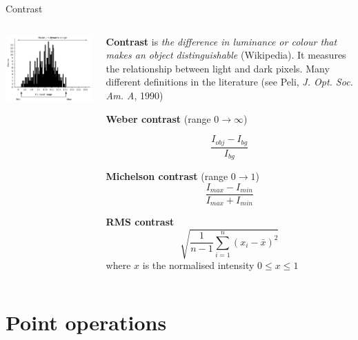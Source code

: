 \documentclass[9pt, aspectratio=169]{beamer}
\begin{document}
\begin{frame}
    {Contrast}
    \begin{columns}
        \begin{column}{.4\textwidth}
            \includegraphics[width=\textwidth]{contrast range.png}
        \end{column}
        \begin{column}{.6\textwidth}
            \textbf{Contrast} is \textit{the difference in luminance or colour that makes an object distinguishable} (Wikipedia). It measures the relationship between light and dark pixels.
            \pause
            Many different definitions in the literature (see Peli, \textit{J. Opt. Soc. Am. A}, 1990)

            \textbf{Weber contrast} (range $0 \rightarrow \infty$)

            $$\frac{I_{obj}-I_{bg}}{I_{bg}}$$

            \textbf{Michelson contrast} (range $0 \rightarrow 1$)
            $$\frac{I_{max}-I_{min}}{I_{max}+I_{min}}$$

            \textbf{RMS contrast}
            $$\sqrt{\frac{1}{n-1}\sum_{i=1}^{n}(x_i-\bar{x})^2}$$ where $x$ is the normalised intensity $0 \leq x \leq 1$

        \end{column}
    \end{columns}
\end{frame}
\section {Point operations}
\end{document}
